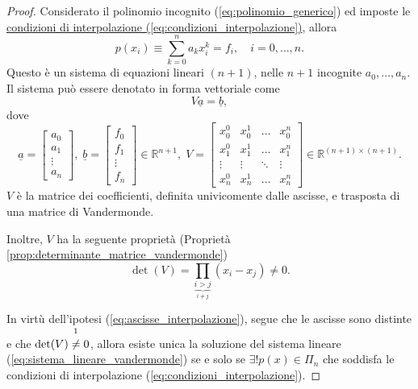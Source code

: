 \begin{proof}
    Considerato il polinomio incognito (\ref{eq:polinomio_generico}) ed imposte le \underline{condizioni di interpolazione (\ref{eq:condizioni_interpolazione})}, allora
    \begin{equation}\label{eq:InterpEqLin}
        p(x_i)\equiv\sum_{k=0}^{n}a_kx_i^k=f_i,\quad i=0,\hdots,n.
    \end{equation}
    Questo è un sistema di equazioni lineari $(n+1)$, nelle $n+1$ incognite $a_0,\hdots,a_n$. Il sistema può essere denotato in forma vettoriale come
    \begin{equation}\label{eq:sistema_lineare_vandermonde}
        V\underline{a}=\underline{b},
    \end{equation}
    dove
    \begin{equation*}
        \underline{a} = 
    \begin{bmatrix}
        a_0\\
        a_1\\
        \vdots\\
        a_n
    \end{bmatrix},\; \underline{b}=
    \begin{bmatrix}
        f_0\\
        f_1\\
        \vdots\\
        f_n
    \end{bmatrix}\in\mathbb R^{n+1},\;
    V=\begin{bmatrix}
        x_0^0 & x_0^1 & \hdots & x_0^n\\
        x_1^0 & x_1^1 & \hdots & x_1^n\\
        \vdots & \vdots &\ddots & \vdots\\
        x_n^0 & x_n^1 & \hdots & x_n^n
    \end{bmatrix}\in\mathbb R^{(n+1)\times (n+1)}.
    \end{equation*}
    $V$ è la matrice dei coefficienti, definita univicomente dalle ascisse, e trasposta di una matrice di Vandermonde.
    
    Inoltre, $V$ ha la seguente proprietà (Proprietà \ref{prop:determinante_matrice_vandermonde})
    \begin{equation*}
    	\det(V)= \prod_{\underbrace{i>j}_{i\neq j}}(x_i-x_j)\neq 0.
    \end{equation*}
    
    In virtù dell'ipotesi (\ref{eq:ascisse_interpolazione}), segue che le ascisse sono distinte e che $\det(V)\overset{\footnotemark}{\neq} 0$, allora esiste unica la soluzione del sistema lineare (\ref{eq:sistema_lineare_vandermonde}) se e solo se $\exists! p(x)\in\Pi_n$ che soddisfa le condizioni di interpolazione (\ref{eq:condizioni_interpolazione}).
\end{proof}

